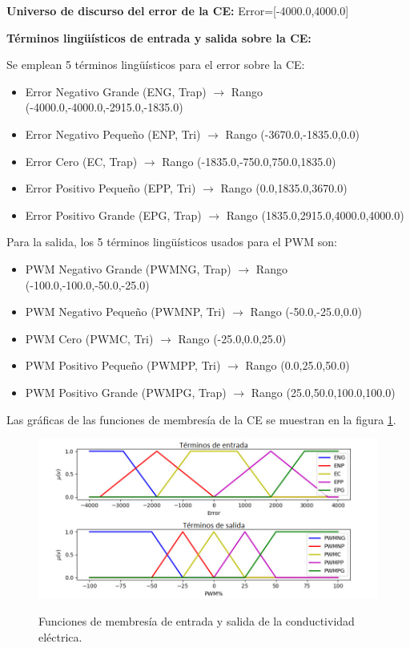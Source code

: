 \textbf{Universo de discurso del error de la CE:} Error=[-4000.0,4000.0]

\textbf{Términos lingüísticos de entrada y salida sobre la CE:}

Se emplean 5 términos lingüísticos para el error sobre la CE:
\begin{itemize}
   
 \item Error Negativo Grande (ENG, Trap) $\longrightarrow$ Rango (-4000.0,-4000.0,-2915.0,-1835.0)
 \item Error Negativo Pequeño (ENP, Tri) $\longrightarrow$ Rango (-3670.0,-1835.0,0.0)
 \item Error Cero (EC, Trap) $\longrightarrow$ Rango (-1835.0,-750.0,750.0,1835.0)
 \item Error Positivo Pequeño (EPP, Tri) $\longrightarrow$ Rango (0.0,1835.0,3670.0)  
 \item Error Positivo Grande (EPG, Trap) $\longrightarrow$ Rango (1835.0,2915.0,4000.0,4000.0)
 \end{itemize}
 
Para la salida, los 5 términos lingüísticos usados para el PWM son:
\begin{itemize}
 \item PWM Negativo Grande (PWMNG, Trap) $\longrightarrow$ Rango (-100.0,-100.0,-50.0,-25.0)
 \item PWM Negativo Pequeño (PWMNP, Tri) $\longrightarrow$ Rango (-50.0,-25.0,0.0)
 \item PWM Cero (PWMC, Tri) $\longrightarrow$ Rango (-25.0,0.0,25.0)
 \item PWM Positivo Pequeño (PWMPP, Tri) $\longrightarrow$ Rango (0.0,25.0,50.0) 
 \item PWM Positivo Grande (PWMPG, Trap) $\longrightarrow$ Rango (25.0,50.0,100.0,100.0)
\end{itemize}

Las gráficas de las funciones de membresía de la CE se muestran en la figura \ref{conduc1}.

\begin{figure}[H]
\centering
         \includegraphics[scale=0.72]{imgs/FuncionCE_Esp.png} \\
    \caption{Funciones de membresía de entrada y salida de la conductividad eléctrica.}\label{conduc1}
\end{figure}


